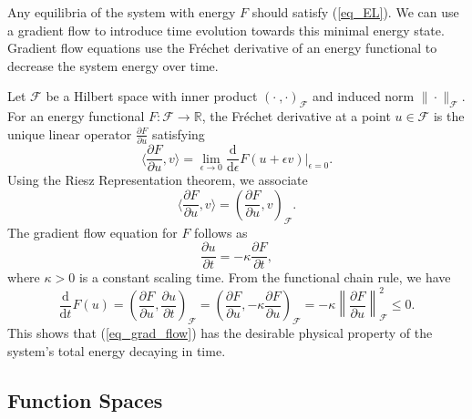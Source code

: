 \documentclass[12pt, reqno]{report}
\theoremstyle{definition}
\theoremstyle{remark}
\newcommand{\ud}{\mathrm{d}}
\begin{document}
Any equilibria of the system with energy $F$ should satisfy (\ref{eq_EL}). 
We can use a gradient flow to introduce time evolution towards this minimal energy state.
Gradient flow equations use the Fr\'echet derivative of an energy functional to decrease the system energy over time.

Let $\mathcal{F}$ be a Hilbert space with inner product $(\cdot ~, \cdot)_{\mathcal{F}}$ and induced norm $\|\cdot\|_{\mathcal{F}}$.
For an energy functional $F:\mathcal{F }\to\mathbb{R}$, the Fr\'echet derivative at a point $u\in\mathcal{F}$ is the unique linear operator $\frac{\partial F}{\partial u}$ satisfying
\begin{equation}
    \langle \frac{\partial F}{\partial u},v\rangle=\lim_{\epsilon\to0}\frac{\ud}{\ud\epsilon}F(u+\epsilon v)\bigg|_{\epsilon=0}.
\end{equation}
Using the Riesz Representation theorem, we associate
\begin{equation}
    \langle \frac{\partial F}{\partial u},v\rangle = (\frac{\partial F}{\partial u},v)_{\mathcal{F}}.
\end{equation}
The gradient flow equation for $F$ follows as
\begin{equation} \label{eq_grad_flow}
    \frac{\partial u}{\partial t}=-\kappa\frac{\partial F}{\partial t},
\end{equation}
where $\kappa>0$ is a constant scaling time. From the functional chain rule, we have 
\begin{equation*}
    \frac{\ud}{\ud t}F(u)=(\frac{\partial F}{\partial u},\frac{\partial u}{\partial t})_{\mathcal{F}}=(\frac{\partial F}{\partial u},-\kappa\frac{\partial F}{\partial u})_{\mathcal{F}}=-\kappa\left\|\frac{\partial F}{\partial u}\right\|_{\mathcal{F}}^2\le0.
\end{equation*}
This shows that (\ref{eq_grad_flow}) has the desirable physical property of the system's total energy decaying in time.

\subsection{Function Spaces}
\end{document}
